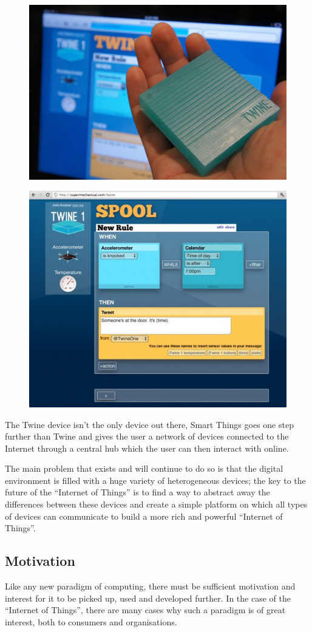 \begin{figure}[h]
	\centering
	\begin{minipage}{.5\textwidth}
		\includegraphics[width=.6\linewidth]{images/twine-device.jpg}
		\label{fig:twine_device}
	\end{minipage}%
	\begin{minipage}{.5\textwidth}
		\includegraphics[width=.6\linewidth]{images/twine-rules.jpg}
	\end{minipage}
\end{figure}

The Twine device isn't the only device out there, Smart Things\cite{SmartThings} goes one step further than Twine and gives the user a network of devices connected to the Internet through a central hub which the user can then interact with online.

The main problem that exists and will continue to do so is that the digital environment is filled with a huge variety of heterogeneous devices; the key to the future of the ``Internet of Things'' is to find a way to abstract away the differences between these devices and create a simple platform on which all types of devices can communicate to build a more rich and powerful ``Internet of Things''.
\newpage
\subsection{Motivation} %
\label{sub:motivation}
Like any new paradigm of computing, there must be sufficient motivation and interest for it to be picked up, used and developed further. In the case of the ``Internet of Things'', there are many cases why such a paradigm is of great interest, both to consumers and organisations.

